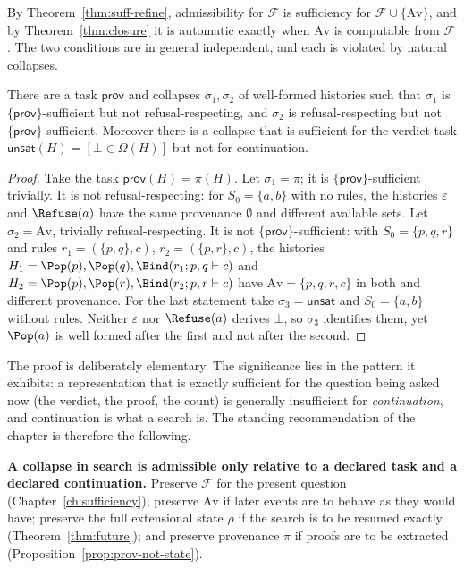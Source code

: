 By Theorem~\ref{thm:suff-refine}, admissibility for $\mathcal F$ is sufficiency for $\mathcal F\cup\{\mathrm{Av}\}$, and by Theorem~\ref{thm:closure} it is automatic exactly when $\mathrm{Av}$ is computable from $\mathcal F$. The two conditions are in general independent, and each is violated by natural collapses.

\begin{proposition}
\label{prop:two-conditions}
There are a task $\mathsf{prov}$ and collapses $\sigma_1,\sigma_2$ of well-formed histories such that $\sigma_1$ is $\{\mathsf{prov}\}$-sufficient but not refusal-respecting, and $\sigma_2$ is refusal-respecting but not $\{\mathsf{prov}\}$-sufficient. Moreover there is a collapse that is sufficient for the verdict task $\mathsf{unsat}(H)=[\bot\in\Omega(H)]$ but not for continuation.
\end{proposition}

\begin{proof}
Take the task $\mathsf{prov}(H)=\pi(H)$. Let $\sigma_1=\pi$; it is $\{\mathsf{prov}\}$-sufficient trivially. It is not refusal-respecting: for $S_0=\{a,b\}$ with no rules, the histories $\varepsilon$ and $\Refuse(a)$ have the same provenance $\emptyset$ and different available sets. Let $\sigma_2=\mathrm{Av}$, trivially refusal-respecting. It is not $\{\mathsf{prov}\}$-sufficient: with $S_0=\{p,q,r\}$ and rules $r_1=(\{p,q\},c)$, $r_2=(\{p,r\},c)$, the histories $H_1=\Pop(p),\Pop(q),\Bind(r_1;p,q\vdash c)$ and $H_2=\Pop(p),\Pop(r),\Bind(r_2;p,r\vdash c)$ have $\mathrm{Av}=\{p,q,r,c\}$ in both and different provenance. For the last statement take $\sigma_3=\mathsf{unsat}$ and $S_0=\{a,b\}$ without rules. Neither $\varepsilon$ nor $\Refuse(a)$ derives $\bot$, so $\sigma_3$ identifies them, yet $\Pop(a)$ is well formed after the first and not after the second.
\end{proof}

The proof is deliberately elementary. The significance lies in the pattern it exhibits: a representation that is exactly sufficient for the question being asked now (the verdict, the proof, the count) is generally insufficient for \emph{continuation}, and continuation is what a search is. The standing recommendation of the chapter is therefore the following.

\begin{principal}
\textbf{A collapse in search is admissible only relative to a declared task and a declared continuation.} Preserve $\mathcal F$ for the present question (Chapter~\ref{ch:sufficiency}); preserve $\mathrm{Av}$ if later events are to behave as they would have; preserve the full extensional state $\rho$ if the search is to be resumed exactly (Theorem~\ref{thm:future}); and preserve provenance $\pi$ if proofs are to be extracted (Proposition~\ref{prop:prov-not-state}).
\end{principal}

